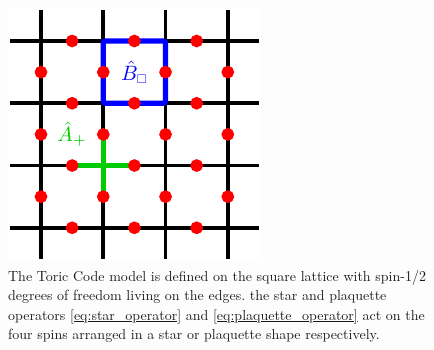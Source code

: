 \begin{figure}
	\centering
	\includegraphics[scale=1]{figures/tikz/toric_code/toric_code_general/toric_code_general.pdf}
	\caption{The Toric Code model is defined on the square lattice with spin-1/2 degrees of freedom living on the edges. the star and plaquette operators \eqref{eq:star_operator} and \eqref{eq:plaquette_operator} act on the four spins arranged in a star or plaquette shape respectively.}
	\label{fig:toric_code_star_and_plaquette_operators}
\end{figure}
